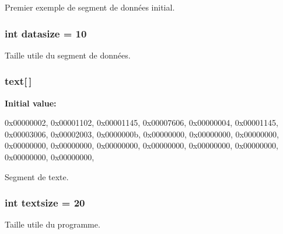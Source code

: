 \-Premier exemple de segment de données initial. 

\hypertarget{prog__simple-bin_8c_a5c7949e884a8b9b3d1ab9f070267bf33}{
\subsubsection[{datasize}]{\setlength{\rightskip}{0pt plus 5cm}int {\bf datasize} = 10}}\label{prog__simple-bin_8c_a5c7949e884a8b9b3d1ab9f070267bf33}


\-Taille utile du segment de données. 

\hypertarget{prog__simple-bin_8c_a53ae7c86b11d9a664628491ba41ca09d}{
\subsubsection[{text}]{ {\bf text}\mbox{[}$\,$\mbox{]}}}\label{prog__simple-bin_8c_a53ae7c86b11d9a664628491ba41ca09d}
{\bfseries \-Initial value\-:}
\begin{DoxyCode}
 {
    0x00000002, 0x00001102, 0x00001145, 0x00007606, 
    0x00000004, 0x00001145, 0x00003006, 0x00002003, 
    0x0000000b, 0x00000000, 0x00000000, 0x00000000, 
    0x00000000, 0x00000000, 0x00000000, 0x00000000, 
    0x00000000, 0x00000000, 0x00000000, 0x00000000, 
}
\end{DoxyCode}


\-Segment de texte. 

\hypertarget{prog__simple-bin_8c_a09c9805cec0364d715497e6564245c48}{
\subsubsection[{textsize}]{\setlength{\rightskip}{0pt plus 5cm}int {\bf textsize} = 20}}\label{prog__simple-bin_8c_a09c9805cec0364d715497e6564245c48}


\-Taille utile du programme. 

